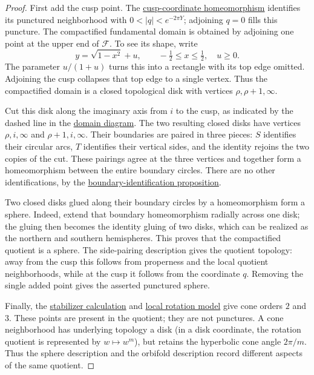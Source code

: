 \begin{proof}
First add the cusp point. The \hyperref[modular.cusp-coordinate]{cusp-coordinate homeomorphism} identifies its punctured neighborhood with $0<|q|<e^{-2\pi Y}$; adjoining $q=0$ fills this puncture. The compactified fundamental domain is obtained by adjoining one point at the upper end of $\mathcal F$. To see its shape, write
\[
 y=\sqrt{1-x^2}+u,\qquad -\tfrac12\leq x\leq\tfrac12,\quad u\geq0.
\]
The parameter $u/(1+u)$ turns this into a rectangle with its top edge omitted. Adjoining the cusp collapses that top edge to a single vertex. Thus the compactified domain is a closed topological disk with vertices $\rho,\rho+1,\infty$.

Cut this disk along the imaginary axis from $i$ to the cusp, as indicated by the dashed line in the \hyperref[modular.domain-diagram]{domain diagram}. The two resulting closed disks have vertices $\rho,i,\infty$ and $\rho+1,i,\infty$. Their boundaries are paired in three pieces: $S$ identifies their circular arcs, $T$ identifies their vertical sides, and the identity rejoins the two copies of the cut. These pairings agree at the three vertices and together form a homeomorphism between the entire boundary circles. There are no other identifications, by the \hyperref[modular.boundary-identifications]{boundary-identification proposition}.

Two closed disks glued along their boundary circles by a homeomorphism form a sphere. Indeed, extend that boundary homeomorphism radially across one disk; the gluing then becomes the identity gluing of two disks, which can be realized as the northern and southern hemispheres. This proves that the compactified quotient is a sphere. The side-pairing description gives the quotient topology: away from the cusp this follows from properness and the local quotient neighborhoods, while at the cusp it follows from the coordinate $q$. Removing the single added point gives the asserted punctured sphere.

Finally, the \hyperref[modular.elliptic-stabilizers]{stabilizer calculation} and \hyperref[modular.orbifold]{local rotation model} give cone orders $2$ and $3$. These points are present in the quotient; they are not punctures. A cone neighborhood has underlying topology a disk (in a disk coordinate, the rotation quotient is represented by $w\mapsto w^m$), but retains the hyperbolic cone angle $2\pi/m$. Thus the sphere description and the orbifold description record different aspects of the same quotient.
\end{proof}

